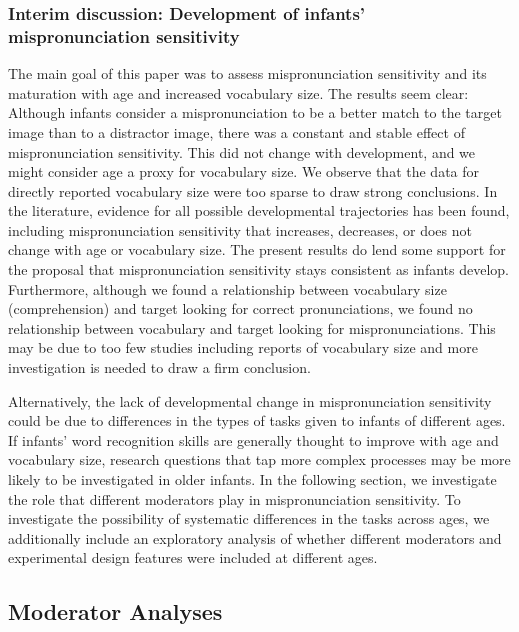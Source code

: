 \documentclass[man]{apa6}
\theoremstyle{definition}
\theoremstyle{definition}
\theoremstyle{definition}
\theoremstyle{remark}
\begin{document}
\subsubsection{Interim discussion: Development of infants'
mispronunciation
sensitivity}\label{interim-discussion-development-of-infants-mispronunciation-sensitivity}

The main goal of this paper was to assess mispronunciation sensitivity
and its maturation with age and increased vocabulary size. The results
seem clear: Although infants consider a mispronunciation to be a better
match to the target image than to a distractor image, there was a
constant and stable effect of mispronunciation sensitivity. This did not
change with development, and we might consider age a proxy for
vocabulary size. We observe that the data for directly reported
vocabulary size were too sparse to draw strong conclusions. In the
literature, evidence for all possible developmental trajectories has
been found, including mispronunciation sensitivity that increases,
decreases, or does not change with age or vocabulary size. The present
results do lend some support for the proposal that mispronunciation
sensitivity stays consistent as infants develop. Furthermore, although
we found a relationship between vocabulary size (comprehension) and
target looking for correct pronunciations, we found no relationship
between vocabulary and target looking for mispronunciations. This may be
due to too few studies including reports of vocabulary size and more
investigation is needed to draw a firm conclusion.

Alternatively, the lack of developmental change in mispronunciation
sensitivity could be due to differences in the types of tasks given to
infants of different ages. If infants' word recognition skills are
generally thought to improve with age and vocabulary size, research
questions that tap more complex processes may be more likely to be
investigated in older infants. In the following section, we investigate
the role that different moderators play in mispronunciation sensitivity.
To investigate the possibility of systematic differences in the tasks
across ages, we additionally include an exploratory analysis of whether
different moderators and experimental design features were included at
different ages.

\subsection{Moderator Analyses}\label{moderator-analyses}
\end{document}

